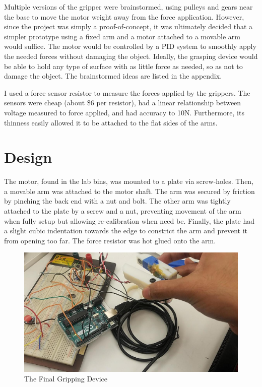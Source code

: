 \documentclass[letterpaper, 10 pt, conference]{ieeeconf}  %
\begin{document}
Multiple versions of the gripper were brainstormed, using pulleys and gears near the base to move the motor weight away from the force application. However, since the project was simply a proof-of-concept, it was ultimately decided that a simpler prototype using a fixed arm and a motor attached to a movable arm would suffice. The motor would be controlled by a PID system to smoothly apply the needed forces without damaging the object. Ideally, the grasping device would be able to hold any type of surface with as little force as needed, so as not to damage the object. The brainstormed ideas are listed in the appendix.

I used a force sensor resistor to measure the forces applied by the grippers. The sensors were cheap (about \$6 per resistor), had a linear relationship between voltage measured to force applied, and had accuracy to 10N. Furthermore, its thinness easily allowed it to be attached to the flat sides of the arms.


\section{Design}

The motor, found in the lab bins, was mounted to a plate via screw-holes. Then, a movable arm was attached to the motor shaft. The arm was secured by friction by pinching the back end with a nut and bolt. The other arm was tightly attached to the plate by a screw and a nut, preventing movement of the arm when fully setup but allowing re-calibration when need be. Finally, the plate had a slight cubic indentation towards the edge to constrict the arm and prevent it from opening too far. The force resistor was hot glued onto the arm.

\begin{figure}[!htb]
	\includegraphics[width=\linewidth]{grasping_device_real_life.jpg}
	\caption{The Final Gripping Device}
	\label{fig:real_life}
\end{figure}
\FloatBarrier
\end{document}
